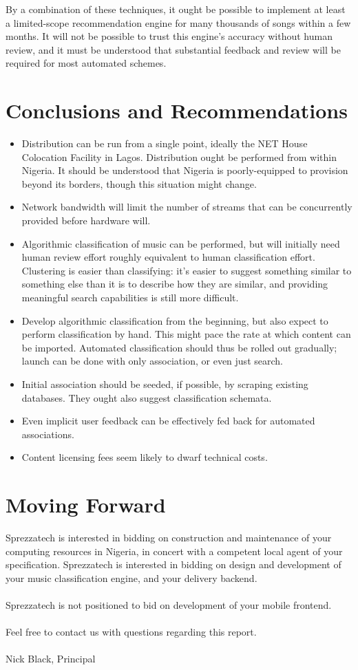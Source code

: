 \documentclass[]{sigplanconf}
\begin{document}
By a combination of these techniques, it ought be possible to implement at least
a limited-scope recommendation engine for many thousands of songs within a few
months. It will not be possible to trust this engine's accuracy without human
review, and it must be understood that substantial feedback and review will be
required for most automated schemes.

\section{Conclusions and Recommendations}
\begin{itemize}
\item Distribution can be run from a single point, ideally the NET House
Colocation Facility in Lagos. Distribution ought be performed from within
Nigeria. It should be understood that Nigeria is poorly-equipped to provision
beyond its borders, though this situation might change.
\item Network bandwidth will limit the number of streams that can be 
concurrently provided before hardware will.
\item Algorithmic classification of music can be performed, but will initially
need human review effort roughly equivalent to human classification effort.
Clustering is easier than classifying: it's easier to suggest something similar
to something else than it is to describe how they are similar, and providing
meaningful search capabilities is still more difficult.
\item Develop algorithmic classification from the beginning, but also expect
to perform classification by hand. This might pace the rate at which content
can be imported. Automated classification should thus be rolled out gradually;
launch can be done with only association, or even just search.
\item Initial association should be seeded, if possible, by scraping existing
databases. They ought also suggest classification schemata.
\item Even implicit user feedback can be effectively fed back for automated
associations.
\item Content licensing fees seem likely to dwarf technical costs.
\end{itemize}

\section{Moving Forward}
Sprezzatech is interested in bidding on construction and maintenance of
your computing resources in Nigeria, in concert with a competent local
agent of your specification. Sprezzatech is interested in bidding on design and
development of your music classification engine, and your delivery backend.\\
\\
Sprezzatech is not positioned to bid on development of your mobile frontend.\\
\\
Feel free to contact us with questions regarding this report.\\
\vspace{1in}\\
Nick Black, Principal

\vfill


\end{document}
